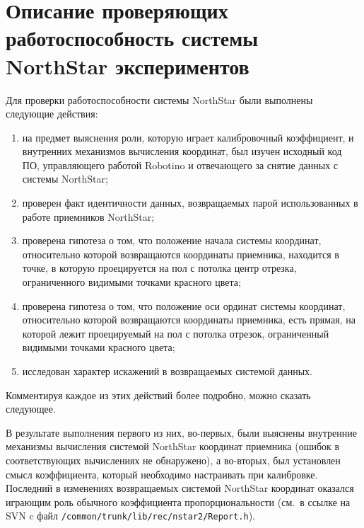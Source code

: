 \chapter{Описание проверяющих работоспособность системы NorthStar экспериментов}\label{app_expers_with_ns}
Для проверки работоспособности системы NorthStar были выполнены следующие действия:
\begin{enumerate}
	\item на предмет выяснения роли, которую играет калибровочный коэффициент, и внутренних механизмов вычисления координат, был изучен исходный код ПО, управляющего работой Robotino и отвечающего за снятие данных с системы NorthStar;
	\item проверен факт идентичности данных, возвращаемых парой использованных в работе приемников NorthStar;
	\item проверена гипотеза о том, что положение начала системы координат, относительно которой возвращаются координаты приемника, находится в точке, в которую проецируется на пол с потолка центр отрезка, ограниченного видимыми точками красного цвета;
	\item проверена гипотеза о том, что положение оси ординат системы координат, относительно которой возвращаются координаты приемника, есть прямая, на которой лежит проецируемый на пол с потолка отрезок, ограниченный видимыми точками красного цвета;
	\item исследован характер искажений в возвращаемых системой данных.
\end{enumerate}

Комментируя каждое из этих действий более подробно, можно сказать следующее.

В результате выполнения первого из них, во-первых, были выяснены внутренние механизмы вычисления системой NorthStar координат приемника (ошибок в соответствующих вычислениях не обнаружено), а во-вторых, был установлен смысл коэффициента, который необходимо настраивать при калибровке.
Последний в изменениях возвращаемых системой NorthStar координат оказался играющим роль обычного коэффициента пропорциональности (см.~в ссылке на SVN c \cite{wiki_openrobotino} файл \verb|/common/trunk/lib/rec/nstar2/Report.h|).

